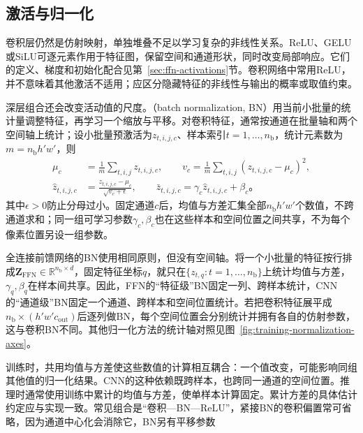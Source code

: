 \subsection{激活与归一化}
\label{sec:cnn-activation-normalization}

卷积层仍然是仿射映射，单独堆叠不足以学习复杂的非线性关系。ReLU、GELU或SiLU可逐元素作用于特征图，保留空间和通道形状，同时改变局部响应。它们的定义、梯度和初始化配合见第~\ref{sec:ffn-activations}节。卷积网络中常用ReLU，并不意味着其他激活不适用；应区分隐藏特征的非线性与输出的概率或取值约束。

深层组合还会改变活动值的尺度。（batch normalization, BN）用当前小批量的统计量调整特征，再学习一个缩放与平移。对卷积特征，通常按通道在批量轴和两个空间轴上统计；设小批量预激活为$z_{t,i,j,c}$、样本索引$t=1,\ldots,n_{\mathrm b}$，统计元素数为$m=n_{\mathrm b}h'w'$，则
\begin{equation}
  \begin{aligned}
    \mu_c&=\frac1m\sum_{t,i,j}z_{t,i,j,c},\qquad
    v_c=\frac1m\sum_{t,i,j}(z_{t,i,j,c}-\mu_c)^2,\\
    \widehat z_{t,i,j,c}&=\frac{z_{t,i,j,c}-\mu_c}{\sqrt{v_c+\epsilon}},\qquad
    \bar z_{t,i,j,c}=\gamma_c\widehat z_{t,i,j,c}+\beta_c\text{。}
  \end{aligned}
  \label{eq:cnn-batch-normalization}
\end{equation}
其中$\epsilon>0$防止分母过小。固定通道$c$后，均值与方差汇集全部$n_{\mathrm b}h'w'$个数值，不跨通道求和；同一组可学习参数$\gamma_c,\beta_c$也在这些样本和空间位置之间共享，不为每个像素位置另设一组参数。

全连接前馈网络的BN使用相同原则，但没有空间轴。将一个小批量的特征按行排成$\bm Z_{\mathrm{FFN}}\in\mathbb R^{n_{\mathrm b}\times d}$，固定特征坐标$q$，就只在$\{z_{t,q}:t=1,\ldots,n_{\mathrm b}\}$上统计均值与方差，$\gamma_q,\beta_q$在样本间共享。因此，FFN的“特征级”BN固定一列、跨样本统计，CNN的“通道级”BN固定一个通道、跨样本和空间位置统计。若把卷积特征展平成$n_{\mathrm b}\times(h'w'c_{\mathrm{out}})$后逐列做BN，每个空间位置会分别统计并拥有各自的仿射参数，这与卷积BN不同。其他归一化方法的统计轴对照见图~\ref{fig:training-normalization-axes}。

训练时，共用均值与方差使这些数值的计算相互耦合：一个值改变，可能影响同组其他值的归一化结果。CNN的这种依赖既跨样本，也跨同一通道的空间位置。推理时通常使用训练中累计的均值与方差，使单样本计算固定。累计方差的具体估计约定应与实现一致。常见组合是“卷积—BN—ReLU”，紧接BN的卷积偏置常可省略，因为通道中心化会消除它，BN另有平移参数

